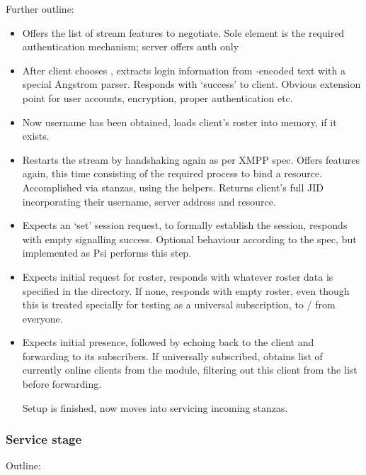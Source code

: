 Further outline:

\begin{itemize}
  \item Offers the list of stream features to negotiate. Sole element is the required authentication mechanism; server offers  auth only

  \item After client chooses , extracts login information from -encoded text with a special Angstrom parser. Responds with `success' to client. Obvious extension point for user accounts, encryption, proper authentication etc.

  \item Now username has been obtained, loads client's roster into memory, if it exists.

  \item Restarts the stream by handshaking again as per XMPP spec. Offers features again, this time consisting of the required process to bind a resource. Accomplished via  stanzas, using the  helpers. Returns client's full JID incorporating their username, server address and resource.

  \item Expects an  `set' session request, to formally establish the session, responds with empty  signalling success. Optional behaviour according to the spec, but implemented as Psi performs this step.

  \item Expects initial request for roster, responds with whatever roster data is specified in the  directory. If none, responds with empty roster, even though this is treated specially for testing as a universal subscription, to / from everyone.

  \item Expects initial presence, followed by echoing back to the client and forwarding to its subscribers. If universally subscribed, obtains list of currently online clients from the  module, filtering out this client from the list before forwarding.

  Setup is finished, now moves into servicing incoming stanzas.
\end{itemize}

\subsubsection{Service stage}
Outline:

